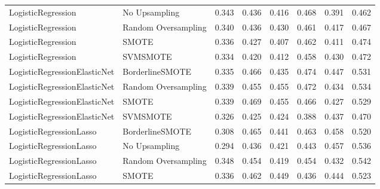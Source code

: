 \begin{tabular}{llllllll}
          LogisticRegression &       No Upsampling & 0.343 &                     0.436 &                 0.416 &                  0.468 &                                   0.391 &     0.462 \\
          LogisticRegression & Random Oversampling & 0.340 &                     0.436 &                 0.430 &                  0.461 &                                   0.417 &     0.467 \\
          LogisticRegression &               SMOTE & 0.336 &                     0.427 &                 0.407 &                  0.462 &                                   0.411 &     0.474 \\
          LogisticRegression &            SVMSMOTE & 0.334 &                     0.420 &                 0.412 &                  0.458 &                                   0.430 &     0.472 \\
LogisticRegressionElasticNet &     BorderlineSMOTE & 0.335 &                     0.466 &                 0.435 &                  0.474 &                                   0.447 &     0.531 \\
LogisticRegressionElasticNet & Random Oversampling & 0.339 &                     0.455 &                 0.455 &                  0.472 &                                   0.434 &     0.534 \\
LogisticRegressionElasticNet &               SMOTE & 0.339 &                     0.469 &                 0.455 &                  0.466 &                                   0.427 &     0.529 \\
LogisticRegressionElasticNet &            SVMSMOTE & 0.326 &                     0.425 &                 0.424 &                  0.388 &                                   0.437 &     0.470 \\
     LogisticRegressionLasso &     BorderlineSMOTE & 0.308 &                     0.465 &                 0.441 &                  0.463 &                                   0.458 &     0.520 \\
     LogisticRegressionLasso &       No Upsampling & 0.294 &                     0.436 &                 0.421 &                  0.443 &                                   0.457 &     0.536 \\
     LogisticRegressionLasso & Random Oversampling & 0.348 &                     0.454 &                 0.419 &                  0.454 &                                   0.432 &     0.542 \\
     LogisticRegressionLasso &               SMOTE & 0.336 &                     0.462 &                 0.449 &                  0.436 &                                   0.444 &     0.523 \\

\end{tabular}
